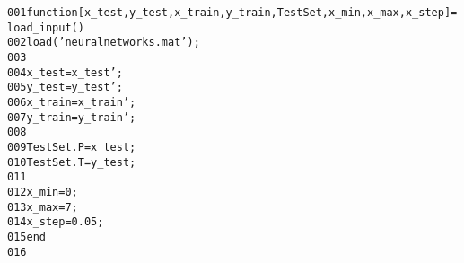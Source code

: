 \begin{alltt}
\textcolor{linenr}{001  }\textcolor{keyword}{function} [ x\_test, y\_test, x\_train, y\_train, TestSet, x\_min, x\_max, x\_step] = load\_input()
\textcolor{linenr}{002  }    load(\textcolor{string}{'neuralnetworks.mat'});
\textcolor{linenr}{003  }
\textcolor{linenr}{004  }    x\_test = x\_test';
\textcolor{linenr}{005  }    y\_test = y\_test';
\textcolor{linenr}{006  }    x\_train = x\_train';
\textcolor{linenr}{007  }    y\_train = y\_train';
\textcolor{linenr}{008  }
\textcolor{linenr}{009  }    TestSet.P = x\_test;
\textcolor{linenr}{010  }    TestSet.T = y\_test;
\textcolor{linenr}{011  }
\textcolor{linenr}{012  }    x\_min = 0;
\textcolor{linenr}{013  }    x\_max = 7;
\textcolor{linenr}{014  }    x\_step = 0.05;
\textcolor{linenr}{015  }\textcolor{keyword}{end}
\textcolor{linenr}{016  }
\end{alltt}
